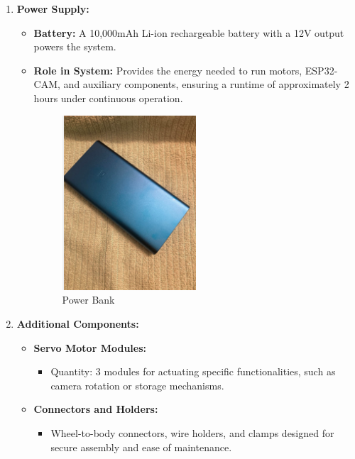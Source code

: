 \documentclass[12pt,a4paper]{report}
\begin{document}
\begin{enumerate}
\begin{itemize}
        
    \end{itemize}



    \item \textbf{Power Supply:}
    \begin{itemize}
        \item \textbf{Battery:} A 10,000mAh Li-ion rechargeable battery with a 12V output powers the system.
        \item \textbf{Role in System:} Provides the energy needed to run motors, ESP32-CAM, and auxiliary components, ensuring a runtime of approximately 2 hours under continuous operation.
        
\begin{figure}[H]
    \centering
    \includegraphics[width=0.5\textwidth]{powerBank}
    \caption{Power Bank}
    \label{fig:powerBank}
\end{figure}        
        
    \end{itemize}

    \item \textbf{Additional Components:}
    \begin{itemize}
        \item \textbf{Servo Motor Modules:}
        \begin{itemize}
            \item Quantity: 3 modules for actuating specific functionalities, such as camera rotation or storage mechanisms.
        \end{itemize}
        \item \textbf{Connectors and Holders:}
        \begin{itemize}
            \item Wheel-to-body connectors, wire holders, and clamps designed for secure assembly and ease of maintenance.
        \end{itemize}
    \end{itemize}
    

\end{enumerate}
\end{document}
